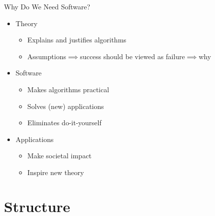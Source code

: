 \documentclass[11pt,compress,xcolor={usenames,dvipsnames},aspectratio=169]{beamer}
\begin{document}
\begin{frame}{Why Do We Need Software?}
	\begin{itemize}
		\item \alert{Theory} 
		\begin{itemize}
			\item Explains and justifies \alert{algorithms}
			\item Assumptions$\implies$success should be viewed as failure$\implies$why
		\end{itemize}
		\item \alert{Software} 
		\begin{itemize}
			\item Makes \alert{algorithms} practical
			\item Solves (new) \alert{applications}
			\item Eliminates \alert{do-it-yourself}
		\end{itemize}
		\item \alert{Applications} 
  		\begin{itemize}
			\item Make \alert{societal} impact
			\item Inspire new \alert{theory}
		\end{itemize}

	\end{itemize}
\end{frame}

\section{Structure}
\end{document}

